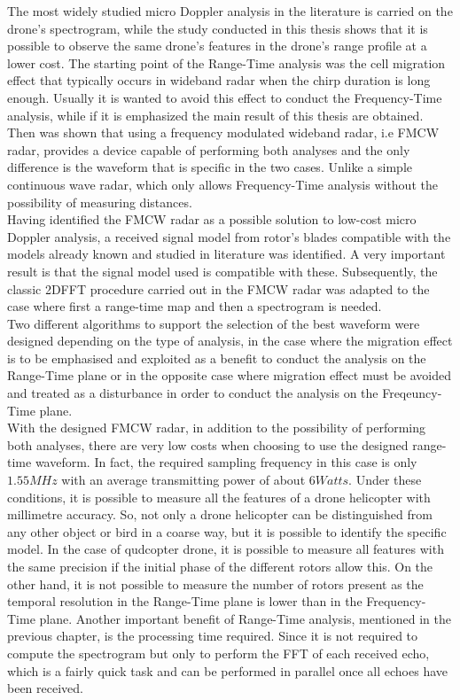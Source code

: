 The most widely studied micro Doppler analysis in the literature is carried on the drone's spectrogram, while the study conducted in this thesis shows that it is possible to observe the same drone's features in the drone's range profile at a lower cost. The starting point of the Range-Time analysis was the cell migration effect that typically occurs in wideband radar when the chirp duration is long enough. Usually it is wanted to avoid this effect to conduct the Frequency-Time analysis, while if it is emphasized the main result of this thesis are obtained. Then was shown that using a frequency modulated wideband radar, i.e FMCW radar, provides a device capable of performing both analyses and the only difference is the waveform that is specific in the two cases. Unlike a simple continuous wave radar, which only allows Frequency-Time analysis without the possibility of measuring distances.\\
Having identified the FMCW radar as a possible solution to low-cost micro Doppler analysis, a received signal model from rotor's blades compatible with the models already known and studied in literature was identified. A very important result is that the signal model used is compatible with these. Subsequently, the classic 2DFFT procedure carried out in the FMCW radar was adapted to the case where first a range-time map and then a spectrogram is needed.\\
Two different algorithms to support the selection of the best waveform were designed depending on the type of analysis, in the case where the migration effect is to be emphasised and exploited as a benefit to conduct the analysis on the Range-Time plane or in the opposite case where migration effect must be avoided and treated as a disturbance in order to conduct the analysis on the Freqeuncy-Time plane.\\
With the designed FMCW radar, in addition to the possibility of performing both analyses, there are very low costs when choosing to use the designed range-time waveform. In fact, the required sampling frequency in this case is only $1.55 MHz$ with an average transmitting power of about $6 Watts$. Under these conditions, it is possible to measure all the features of a drone helicopter with millimetre accuracy. So, not only a drone helicopter can be distinguished from any other object or bird in a coarse way, but it is possible to identify the specific model. In the case of qudcopter drone, it is possible to measure all features with the same precision if the initial phase of the different rotors allow this. On the other hand, it is not possible to measure the number of rotors present as the temporal resolution in the Range-Time plane is lower than in the Frequency-Time plane. Another important benefit of Range-Time analysis, mentioned in the previous chapter, is the processing time required. Since it is not required to compute the spectrogram but only to perform the FFT of each received echo, which is a fairly quick task and can be performed in parallel once all echoes have been received.\\
